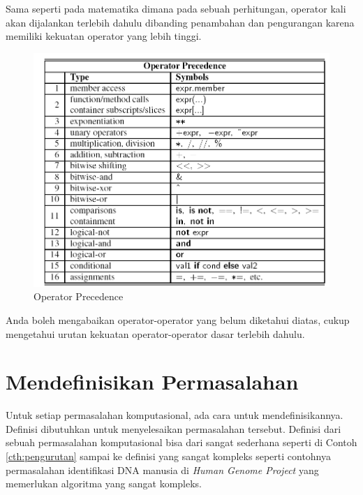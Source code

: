 \FloatBarrier

Sama seperti pada matematika dimana pada sebuah perhitungan, operator kali akan dijalankan terlebih dahulu dibanding penambahan dan pengurangan karena memiliki kekuatan operator yang lebih tinggi. 
	\begin{figure}
	\includegraphics[scale=0.50]{fig/1/Gambar21.png}
	\caption{Operator Precedence}
	\label{fig:operatorPrecedence}
	\end{figure}	
Anda boleh mengabaikan operator-operator yang belum diketahui diatas, cukup mengetahui urutan kekuatan operator-operator dasar terlebih dahulu.	

\section{Mendefinisikan Permasalahan}

Untuk setiap permasalahan komputasional, ada cara untuk mendefinisikannya. Definisi dibutuhkan untuk menyelesaikan permasalahan tersebut. Definisi dari sebuah permasalahan komputasional bisa dari sangat sederhana seperti di Contoh \ref{cth:pengurutan} sampai ke definisi yang sangat kompleks seperti contohnya permasalahan identifikasi DNA manusia di \textit{Human Genome Project} yang memerlukan algoritma yang sangat kompleks.

